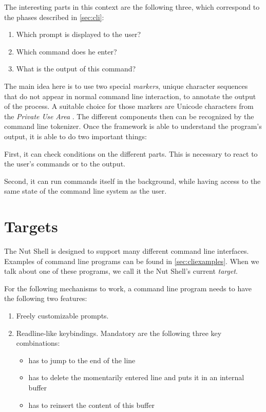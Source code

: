 \documentclass[paper=a4,twoside,abstract=on,cleardoublepage=empty,numbers=noenddot,toc=bib,12pt,appendixprefix=true]{scrreprt}
\begin{document}
The interesting parts in this context are the following three, which correspond to the phases described in \cref{sec:cli}:

\begin{enumerate}
    \item Which prompt is displayed to the user?
    \item Which command does he enter?
    \item What is the output of this command?
\end{enumerate}

The main idea here is to use two special \emph{markers}, unique character sequences that do not appear in normal command line interaction, to annotate the output of the process. A suitable choice for those markers are Unicode characters from the \emph{Private Use Area} \cite[p. 558]{unicode6.2}. The different components then can be recognized by the command line tokenizer. Once the framework is able to understand the program's output, it is able to do two important things:

First, it can check conditions on the different parts. This is necessary to react to the user's commands or to the output.

Second, it can run commands itself in the background, while having access to the same state of the command line system as the user.

\section{Targets}
\label{sec:targets}

The Nut Shell is designed to support many different command line interfaces. Examples of command line programs can be found in \cref{sec:cliexamples}. When we talk about one of these programs, we call it the Nut Shell's current \emph{target}.

For the following mechanisms to work, a command line program needs to have the following two features:

\begin{enumerate}
    \item Freely customizable prompts.
    \item Readline-like keybindings. Mandatory are the following three key combinations:
        \begin{itemize}
            \item {} has to jump to the end of the line

            \item {} has to delete the momentarily entered line and puts it in an internal buffer
            
            \item {} has to reinsert the content of this buffer
        \end{itemize}
\end{enumerate}
\end{document}
